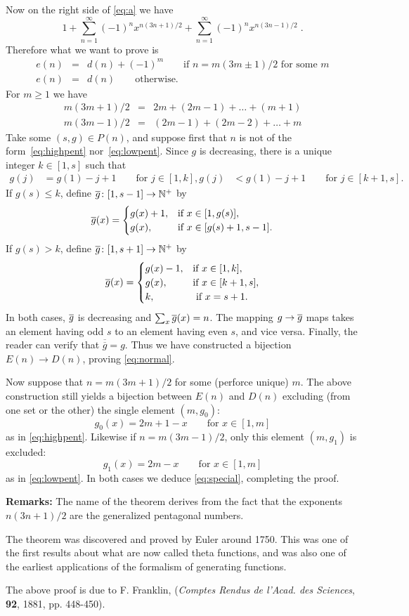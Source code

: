 \documentclass[12pt]{article}
\begin{document}
Now on the right side of \eqref{eq:a} we have
$$1+\sum_{n=1}^{\infty}(-1)^nx^{n(3n+1)/2}+
     \sum_{n=1}^{\infty}(-1)^nx^{n(3n-1)/2}\;.$$
Therefore what we want to prove is
\begin{eqnarray}
\label{eq:special}
e(n)&=&d(n)+(-1)^m\qquad\text{if }n=m(3m\pm 1)/2\text{ for some }m \\
\label{eq:normal}
e(n)&=&d(n)\qquad\text{otherwise.}
\end{eqnarray}
For $m\ge 1$ we have
\begin{eqnarray}
\label{eq:highpent}
m(3m+1)/2 &=& 2m+(2m-1)+\ldots+(m+1) \\
\label{eq:lowpent}
m(3m-1)/2 &=& (2m-1)+(2m-2)+\ldots+m
\end{eqnarray}
Take some $(s,g)\in P(n)$, and suppose first that $n$ is not
of the form~\eqref{eq:highpent} nor~\eqref{eq:lowpent}.
Since $g$ is decreasing, there is a unique integer
$k\in[1,s]$ such that
\begin{align*}
g(j)&=g(1)-j+1\qquad\text{for }j\in[1,k],
g(j)&<g(1)-j+1\qquad\text{for }j\in[k+1,s].
\end{align*}
If $g(s)\le k$, define $\overline{g}\colon [1,s-1]\to\mathbb{N}^+$ by
$$\overline{g}(x)=
\begin{cases}
g(x)+1, &\text{if }x\in[1,g(s)], \\
g(x),   &\text{if }x\in[g(s)+1,s-1].
\end{cases}$$
If $g(s)>k$, define $\overline{g}\colon [1,s+1]\to\mathbb{N}^+$ by
$$\overline{g}(x)=
\begin{cases}
g(x)-1, &\text{if }x\in[1,k], \\
g(x),   &\text{if }x\in[k+1,s],\\
k,      &\text{ if }x=s+1.
\end{cases}$$
In both cases, $\overline{g}$ is decreasing and $\sum_x\overline{g}(x)=n$.
The mapping $g\to\overline{g}$ maps takes an element having odd $s$
to an element having even $s$, and vice versa.
Finally, the reader can verify that $\overline{\overline{g}}=g$.
Thus we have constructed a bijection $E(n)\to D(n)$,
proving \eqref{eq:normal}.

Now suppose that $n=m(3m+1)/2$ for some (perforce unique) $m$.
The above construction still yields a bijection between
$E(n)$ and $D(n)$ excluding (from one set or the other) the single
element $(m,g_0)$:
$$g_0(x)=2m+1-x\qquad\text{for }x\in[1,m]$$
as in \eqref{eq:highpent}.
Likewise if $n=m(3m-1)/2$, only this element $(m,g_1)$ is excluded:
$$g_1(x)=2m-x\qquad\text{for }x\in[1,m]$$
as in \eqref{eq:lowpent}.
In both cases we deduce \eqref{eq:special}, completing the proof.

\textbf{Remarks: }The name of the theorem derives from the fact that
the exponents $n(3n+1)/2$ are the generalized pentagonal numbers.

The theorem was discovered and proved by Euler around 1750.
This was one of the first results about what are now called theta
functions, and was also one of the earliest applications of
the formalism of generating functions.

The above proof is due to F. Franklin,
(\emph{Comptes Rendus de l'Acad. des Sciences},
\textbf{92}, 1881, pp. 448-450).
\end{document}
